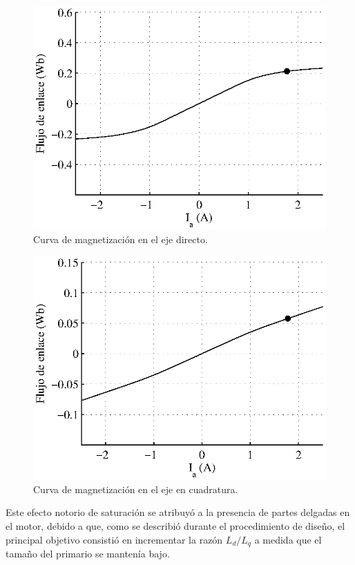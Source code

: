 \begin{figure}[hbtp]
\centering
\includegraphics[scale=1]{../img/Desarrollo_de_un_diseno_inicial/daxismagnetization.eps}
\caption{Curva de magnetización en el eje directo.}
\label{fig:daxismagnetization}
\end{figure}

\begin{figure}[hbtp]
\centering
\includegraphics[scale=1]{../img/Desarrollo_de_un_diseno_inicial/qaxismagnetization.eps}
\caption{Curva de magnetización en el eje en cuadratura.}
\label{fig:qaxismagnetization}
\end{figure}

Este efecto notorio de saturación se atribuyó a la presencia de partes delgadas en el motor, debido a que, como se describió durante el procedimiento de diseño, el principal objetivo consistió en incrementar la razón $L_d/L_q$ a medida que el tamaño del primario se mantenía bajo.

